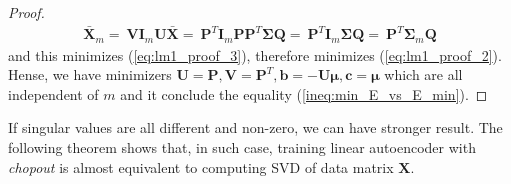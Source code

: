 \documentclass{article}
\begin{document}
\begin{proof}
    \begin{align}
        \bar{\mathbf{X}}_m 
        = \ \mathbf{V} \mathbf{I}_m \mathbf{U} \bar{\mathbf{X}}
        = \ \mathbf{P}^T \mathbf{I}_m \mathbf{P} \mathbf{P}^T \mathbf{\Sigma} \mathbf{Q}
        = \ \mathbf{P}^T \mathbf{I}_m \mathbf{\Sigma} \mathbf{Q}
        = \ \mathbf{P}^T \mathbf{\Sigma}_m \mathbf{Q} \nonumber
    \end{align}
    and this minimizes (\ref{eq:lm1_proof_3}), therefore minimizes (\ref{eq:lm1_proof_2}). Hense, we have minimizers $\mathbf{U} = \mathbf{P}, \mathbf{V} = \mathbf{P}^T, \mathbf{b} = -\mathbf{U}\mathbf{\mu}, \mathbf{c} = \mathbf{\mu}$ which are all independent of $m$ and it conclude the equality (\ref{ineq:min_E_vs_E_min}).
    \end{proof}
    
    If singular values are all different and non-zero, we can have stronger result. The following theorem shows that, in such case, training linear autoencoder with \textit{chopout} is almost equivalent to computing SVD of data matrix $\mathbf{X}$.
    
\end{document}
